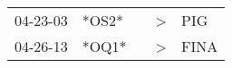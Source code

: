 \begin{supertabular}{lllll}
 04-23-03 &  *OS2* &   &  \textgreater &   PIG \\
 04-26-13 &  *OQ1* &   &  \textgreater &  FINA \\
\end{supertabular}
